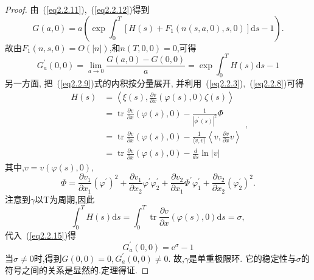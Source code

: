 \begin{proof}
  由~(\ref{eq2.2.11}),~(\ref{eq2.2.12})得到
  \begin{equation*}
G(a, 0)=a\left(\exp \int_{0}^{T}\left[H(s)+F_{1}(n(s, a, 0), s, 0)\right] \mathrm{d} s-1\right).
\end{equation*}
故由$F_{1}(n, s, 0)=O(|n|)$,和$n(T, 0,0)=0$,可得
\begin{equation}
  \label{eq2.2.15}
G_{a}^{\prime}(0,0)=\lim _{a \rightarrow 0} \frac{G(a, 0)-G(0,0)}{a}=\exp \int_{0}^{T} H(s) \mathrm{d} s-1
\end{equation}
另一方面,
把~(\ref{eq2.2.9})式的内积按分量展开,
并利用~(\ref{eq2.2.3}),~(\ref{eq2.2.8})可得
\begin{equation*}
\begin{aligned} H(s) &=\left\langle\xi(s), \frac{\partial v}{\partial x}(\varphi(s), 0) \zeta(s)\right\rangle \\ &=\operatorname{tr} \frac{\partial v}{\partial x}(\varphi(s), 0)-\frac{1}{\left|\phi^{\prime}(s)\right|^{2}} \Phi \\ &=\operatorname{tr} \frac{\partial v}{\partial x}(\varphi(s), 0)-\frac{1}{\langle v, v\rangle}\left\langle v, \frac{\partial v}{\partial x} v\right\rangle \\ &=\operatorname{tr} \frac{\partial v}{\partial x}(\varphi(s), 0)-\frac{d}{d s} \ln |v| \end{aligned},
\end{equation*}
其中,$v=v(\varphi(s),0)$,
\begin{equation*}
\Phi=\frac{\partial v_{1}}{\partial x_{1}}\left(\varphi^{\prime}\right)^{2}+\frac{\partial v_{1}}{\partial x_{2}} \varphi^{\prime} \varphi_{2}^{\prime}+\frac{\partial v_{2}}{\partial x_{1}} \Phi^{\prime} \varphi_{1}^{\prime}+\frac{\partial v_{2}}{\partial x_{2}}\left(\varphi_{2}^{\prime}\right)^{2}.
\end{equation*}
注意到$\gamma$以T为周期,因此
\begin{equation*}
\int_{0}^{T} H(s) \mathrm{d} s=\int_{0}^{T} \operatorname{tr} \frac{\partial v}{\partial x}(\varphi(s), 0) \mathrm{d} s=\sigma,
\end{equation*}
代入~(\ref{eq2.2.15})得
\begin{equation*}
G_{a}^{\prime}(0,0)=\mathrm{e}^{\sigma}-1
\end{equation*}
当$\sigma \neq 0$时,得到$G(0,0)=0, G_{a}^{\prime}(0,0) \neq 0$.
故,$\gamma$是单重极限环.
它的稳定性与$\sigma $的符号之间的关系是显然的.定理得证.
\end{proof}

